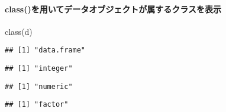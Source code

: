 \documentclass[
]{article}
\newenvironment{Shaded}{\begin{snugshade}}{\end{snugshade}}
\newcommand{\CommentTok}[1]{\textcolor[rgb]{0.56,0.35,0.01}{\textit{#1}}}
\newcommand{\FunctionTok}[1]{\textcolor[rgb]{0.00,0.00,0.00}{#1}}
\newcommand{\NormalTok}[1]{#1}
\newcommand{\SpecialCharTok}[1]{\textcolor[rgb]{0.00,0.00,0.00}{#1}}
\begin{document}
\hypertarget{classux3092ux7528ux3044ux3066ux30c7ux30fcux30bfux30aaux30d6ux30b8ux30a7ux30afux30c8ux304cux5c5eux3059ux308bux30afux30e9ux30b9ux3092ux8868ux793a}{%
\paragraph{class()を用いてデータオブジェクトが属するクラスを表示}\label{classux3092ux7528ux3044ux3066ux30c7ux30fcux30bfux30aaux30d6ux30b8ux30a7ux30afux30c8ux304cux5c5eux3059ux308bux30afux30e9ux30b9ux3092ux8868ux793a}}

\begin{Shaded}
\begin{Highlighting}[]
\FunctionTok{class}\NormalTok{(d)}
\end{Highlighting}
\end{Shaded}

\begin{verbatim}
## [1] "data.frame"
\end{verbatim}

\begin{Shaded}
\end{Shaded}

\begin{verbatim}
## [1] "integer"
\end{verbatim}

\begin{Shaded}
\end{Shaded}

\begin{verbatim}
## [1] "numeric"
\end{verbatim}

\begin{Shaded}
\end{Shaded}

\begin{verbatim}
## [1] "factor"
\end{verbatim}
\end{document}
